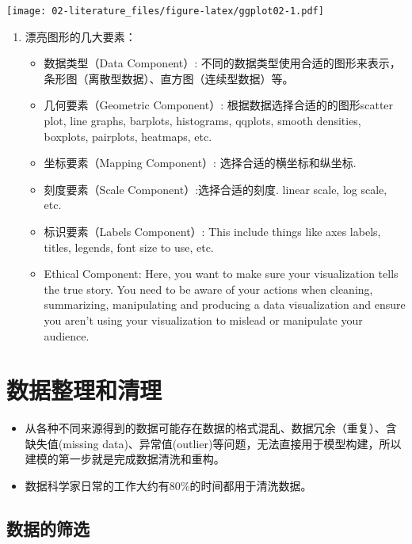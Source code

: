 \documentclass[
]{book}
\providecommand{\tightlist}{%
  \setlength{\itemsep}{0pt}\setlength{\parskip}{0pt}}
\begin{document}
\texttt{[image: 02-literature\_files/figure-latex/ggplot02-1.pdf]}

\begin{enumerate}
\def\labelenumi{\arabic{enumi}.}
\setcounter{enumi}{5}
\tightlist
\item
  漂亮图形的几大要素：

  \begin{itemize}
  \tightlist
  \item
    数据类型（Data Component）: 不同的数据类型使用合适的图形来表示，条形图（离散型数据）、直方图（连续型数据）等。
  \item
    几何要素（Geometric Component）: 根据数据选择合适的的图形scatter plot, line graphs, barplots, histograms, qqplots, smooth densities, boxplots, pairplots, heatmaps, etc.
  \item
    坐标要素（Mapping Component）: 选择合适的横坐标和纵坐标.
  \item
    刻度要素（Scale Component）:选择合适的刻度. linear scale, log scale, etc.
  \item
    标识要素（Labels Component）: This include things like axes labels, titles, legends, font size to use, etc.
  \item
    Ethical Component: Here, you want to make sure your visualization tells the true story. You need to be aware of your actions when cleaning, summarizing, manipulating and producing a data visualization and ensure you aren't using your visualization to mislead or manipulate your audience.
  \end{itemize}
\end{enumerate}

\hypertarget{ux6570ux636eux6574ux7406ux548cux6e05ux7406}{%
\chapter{数据整理和清理}\label{ux6570ux636eux6574ux7406ux548cux6e05ux7406}}

\begin{itemize}
\item
  从各种不同来源得到的数据可能存在数据的格式混乱、数据冗余（重复）、含缺失值(missing data)、异常值(outlier)等问题，无法直接用于模型构建，所以建模的第一步就是完成数据清洗和重构。
\item
  数据科学家日常的工作大约有80\%的时间都用于清洗数据。
\end{itemize}

\hypertarget{ux6570ux636eux7684ux7b5bux9009}{%
\section{数据的筛选}\label{ux6570ux636eux7684ux7b5bux9009}}
\end{document}
